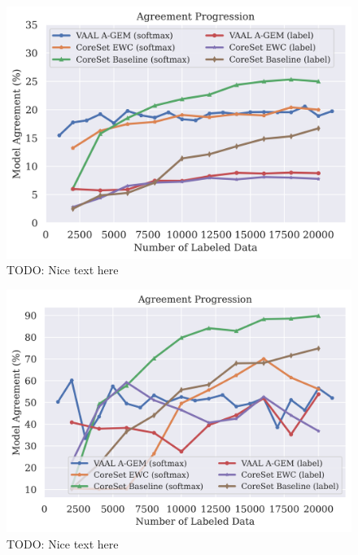 \begin{figure}[h]
    \centering
    \includegraphics[width=0.8\linewidth]{images/results_CALMS/cifar100_vaal_agem.png}
    \caption[Agreement Comparison for Model Stealing on CIFAR-100 using VAAL and AGEM]{TODO: Nice text here}
    \label{fig:CALMScifar100VAAL_AGEM}
\end{figure}

\begin{figure}[h]
    \centering
    \includegraphics[width=0.8\linewidth]{images/results_CALMS/mnist_vaal_agem.png}
    \caption[Agreement Comparison for Model Stealing on MNIST using VAAL and AGEM]{TODO: Nice text here}
    \label{fig:CALMSmnistVAAL_AGEM}
\end{figure}